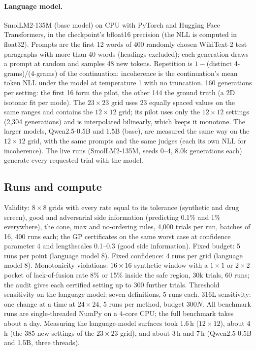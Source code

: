 \documentclass{article}
\begin{document}
\paragraph{Language model.} SmolLM2-135M (base model) on CPU with PyTorch
and Hugging Face Transformers, in the checkpoint's bfloat16 precision (the
NLL is computed in float32). Prompts are the first 12 words of 400
randomly chosen WikiText-2 test paragraphs with more than 40 words
(headings excluded); each generation draws a prompt at random and samples
48 new tokens. Repetition is $1-{}$(distinct 4-grams)/(4-grams) of the
continuation; incoherence is the continuation's mean token NLL under the
model at temperature 1 with no truncation. 160 generations per setting:
the first 16 form the pilot, the other 144 the ground truth (a 2D
isotonic fit per mode). The $23\times23$ grid uses 23 equally spaced
values on the same ranges and contains the $12\times12$ grid; its pilot
uses only the $12\times12$ settings (2{,}304 generations) and is
interpolated bilinearly, which keeps it monotone. The larger models,
Qwen2.5-0.5B and 1.5B (base), are measured the same way on the
$12\times12$ grid, with the same prompts and the same judges (each its own
NLL for incoherence). The live runs (SmolLM2-135M, seeds 0--4, 8.0k
generations each) generate every requested trial with the model.

\subsection{Runs and compute}
Validity: $8\times8$ grids with every rate equal to its tolerance
(synthetic and drug screen), good and adversarial side information
(predicting 0.1\% and 1\% everywhere), the cone, max and no-ordering
rules, 4{,}000 trials per run, batches of 16, 400 runs each; the GP
certificates on the same worst case at confidence parameter 4 and
lengthscales 0.1--0.3 (good side information). Fixed budget:
5 runs per point (language model 8). Fixed confidence: 4 runs per grid
(language model 8). Monotonicity violations: $16\times16$ synthetic
window with a $1\times1$ or $2\times2$ pocket of lack-of-fusion rate 8\%
or 15\% inside the safe region, 30k trials, 60 runs; the audit gives each
certified setting up to 300 further trials. Threshold sensitivity on the
language model: seven definitions, 5 runs each. 316L sensitivity: one
change at a time at $24\times24$, 5 runs per method, budget $300N$.
All benchmark runs are
single-threaded NumPy on a 4-core CPU; the full benchmark takes about a
day. Measuring the language-model surfaces took 1.6\,h ($12\times12$),
about 4\,h (the 385 new settings of the $23\times23$ grid), and about
3\,h and 7\,h (Qwen2.5-0.5B and 1.5B, three threads).
\end{document}
